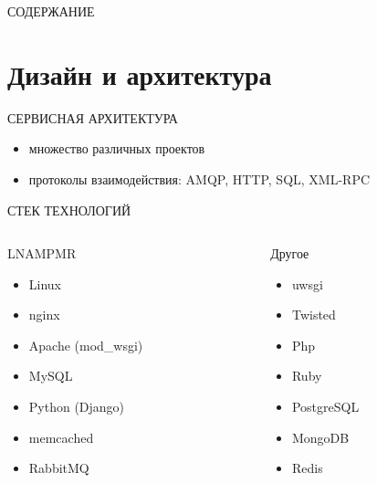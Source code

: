 \documentclass[aspectratio=169]{beamer}
\begin{document}
\begin{frame}{СОДЕРЖАНИЕ}
    \tableofcontents
\end{frame}

\section{Дизайн и архитектура}
\begin{frame}{СЕРВИСНАЯ АРХИТЕКТУРА}
    \begin{itemize}
        \item множество различных проектов
        \item протоколы взаимодействия: AMQP, HTTP, SQL, XML-RPC
    \end{itemize}
\end{frame}

\begin{frame}{СТЕК ТЕХНОЛОГИЙ}
    \begin{columns}
        \begin{column}{0.4\textwidth}
            \begin{block}{LNAMPMR}
            \begin{itemize}
                \item Linux
                \item nginx
                \item Apache (mod\_wsgi)
                \item MySQL
                \item Python (Django)
                \item memcached
                \item RabbitMQ
            \end{itemize}
            \end{block}
        \end{column}

        \begin{column}{0.4\textwidth}
            \begin{block}{Другое}
            \begin{itemize}
                \item uwsgi
                \item Twisted
                \item Php
                \item Ruby
                \item PostgreSQL
                \item MongoDB
                \item Redis
            \end{itemize}
            \end{block}
        \end{column}
    \end{columns}
\end{frame}
\end{document}
